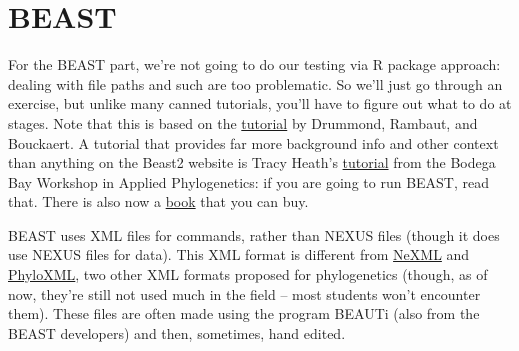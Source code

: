\documentclass[]{book}
\theoremstyle{definition}
\theoremstyle{definition}
\theoremstyle{remark}
\begin{document}
\section{BEAST}\label{beast}

For the BEAST part, we're not going to do our testing via R package
approach: dealing with file paths and such are too problematic. So we'll
just go through an exercise, but unlike many canned tutorials, you'll
have to figure out what to do at stages. Note that this is based on the
\href{https://github.com/CompEvol/beast2/blob/master/doc/tutorials/DivergenceDating/DivergenceDatingTutorialv2.0.3.pdf?raw=true}{tutorial}
by Drummond, Rambaut, and Bouckaert. A tutorial that provides far more
background info and other context than anything on the Beast2 website is
Tracy Heath's
\href{http://phyloworks.org/workshops/DivTime_BEAST2_tutorial_FBD.pdf}{tutorial}
from the Bodega Bay Workshop in Applied Phylogenetics: if you are going
to run BEAST, read that. There is also now a
\href{http://beast2.org/book/}{book} that you can buy.

BEAST uses XML files for commands, rather than NEXUS files (though it
does use NEXUS files for data). This XML format is different from
\href{http://www.nexml.org}{NeXML} and
\href{http://www.phyloxml.org}{PhyloXML}, two other XML formats proposed
for phylogenetics (though, as of now, they're still not used much in the
field -- most students won't encounter them). These files are often made
using the program BEAUTi (also from the BEAST developers) and then,
sometimes, hand edited.
\end{document}
